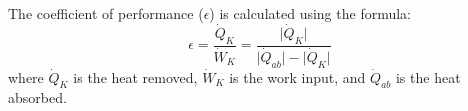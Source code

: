 The coefficient of performance (\(\epsilon\)) is calculated using the formula:  
\[
\epsilon = \frac{\dot{Q}_K}{\dot{W}_K} = \frac{\lvert \dot{Q}_K \rvert}{\lvert \dot{Q}_{ab} \rvert - \lvert \dot{Q}_K \rvert}
\]  
where \(\dot{Q}_K\) is the heat removed, \(\dot{W}_K\) is the work input, and \(\dot{Q}_{ab}\) is the heat absorbed.